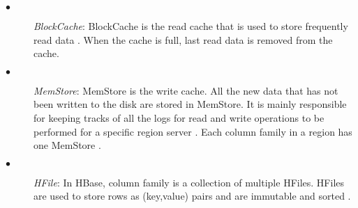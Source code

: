 \documentclass[11pt,a4paper,bibtotoc,idxtotoc,headsepline,footsepline,footexclude,BCOR12mm,DIV13]{scrbook}
\begin{document}
\begin{description}
	\item[$\bullet$]  \emph{BlockCache}: BlockCache is the read cache that is used to store frequently read data \cite{hbase:insights}. When the cache is full, last read data is removed from the cache.
\end{description}

\begin{description}
	\item[$\bullet$] \emph{MemStore}: MemStore is the write cache. All the new data that has not been written to the disk are stored in MemStore. It is mainly responsible for keeping tracks of all the logs for read and write operations to be performed for a specific region server \cite{hbase:architecture}. Each column family in a region has one MemStore \cite{hbase:insights}.
\end{description}

\begin{description}
	\item[$\bullet$] \emph{HFile}: In HBase, column family is a collection of multiple HFiles. HFiles are used to store rows as (key,value) pairs and are immutable and sorted \cite{hbase:insights}.
\end{description}
\end{document}
